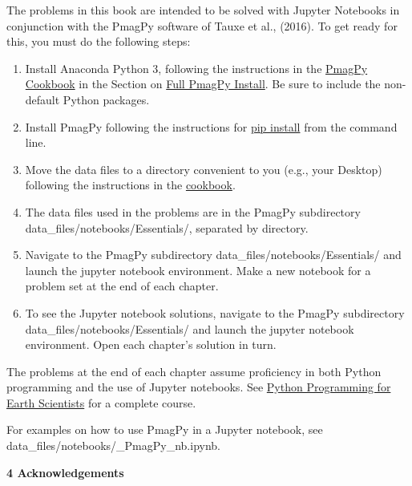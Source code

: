 The problems in this book are intended to be solved with Jupyter Notebooks in conjunction with the PmagPy software of \nocite{tauxe16} Tauxe et al., (2016).  To  get ready for this, you must do the following steps:

\begin{enumerate}
\item Install Anaconda Python 3, following the instructions in the  \href{http://earthref.org/PmagPy} {PmagPy Cookbook} in the Section on  \href{http://earthref.org/PmagPy/cookbook/#getting_python}{ Full PmagPy Install}.  Be sure to include the non-default Python packages. 
\item Install PmagPy following the instructions for \href{http://earthref.org/PmagPy/cookbook/#pip_install}{pip install} from the command line.   
\item  Move the data files to a directory convenient to you (e.g., your Desktop) following the instructions in the \href{http://earthref.org/PmagPy/cookbook/#move_data_files}{cookbook}.  
\item The data files used in the problems are in the PmagPy subdirectory data\_files/notebooks/Essentials/, separated by directory.  
\item Navigate to the PmagPy subdirectory data\_files/notebooks/Essentials/ and launch the jupyter notebook environment. Make a new notebook for a problem set at the end of each chapter. 
\item To see the Jupyter notebook solutions, navigate to the PmagPy subdirectory data\_files/notebooks/Essentials/ and launch the jupyter notebook environment.  Open each chapter's solution in turn. 
\end{enumerate}


The problems at the end of each chapter assume proficiency in both Python programming and the use of Jupyter notebooks.   See \href{https://nbviewer.jupyter.org/github/ltauxe/Python-for-Earth-Science-Students/blob/master/Lecture_01_syllabus.ipynb}{Python Programming  for Earth Scientists} for a complete course.   

For examples on how to use PmagPy in a Jupyter notebook, see data\_files/notebooks/\_PmagPy\_nb.ipynb.   





\noindent
{\bf 4 Acknowledgements}
  
